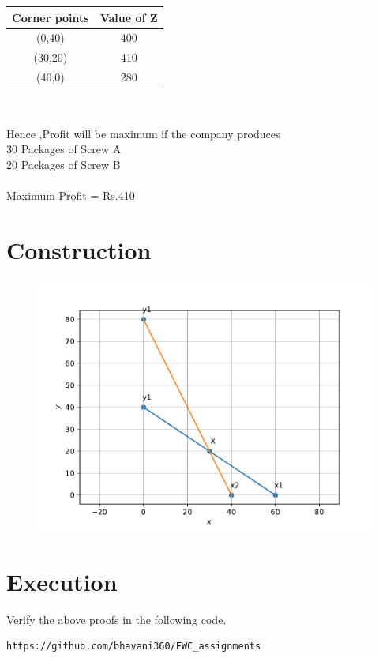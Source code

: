 \documentclass[journal,10pt]{article}
\begin{document}
\begin{center}
\begin{tabular}{|c|c|}
	\hline
	\textbf{Corner points}&\textbf{Value of Z}\\
	\hline
	(0,40)&400\\
    \hline
	(30,20)&410\\
	\hline
	(40,0)&280\\
	\hline
\end{tabular}\\
\end{center}
Hence ,Profit will be maximum if the company produces\\
30 Packages of Screw A\\
20 Packages of Screw B\\\\
Maximum Profit = Rs.410
\section*{Construction}
\begin{figure}[h]
\includegraphics[scale=0.5]{op1.pdf} 
\end{figure}
\section*{Execution}
Verify the above proofs in the following code.\\
\begin{lstlisting}
https://github.com/bhavani360/FWC_assignments
\end{lstlisting}
 
\end{document}
